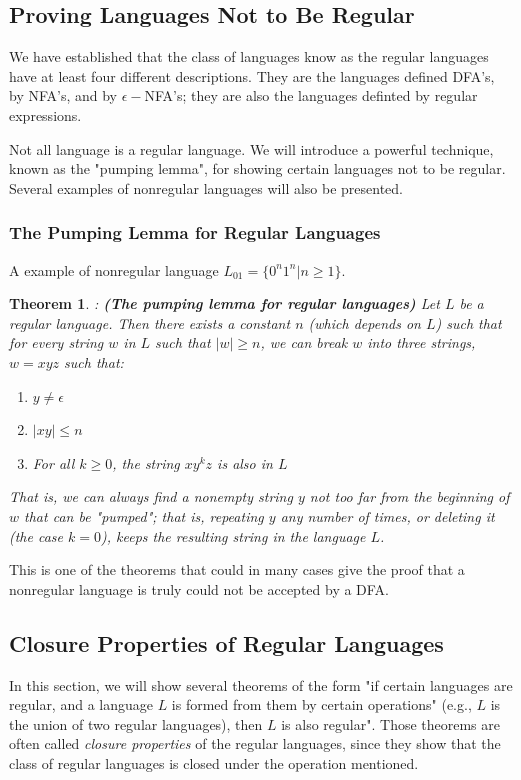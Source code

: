 \documentclass[12pt,reqno]{amsart}
\newtheorem{thm}{Theorem}[section]
\begin{document}
\subsection{Proving Languages Not to Be Regular}
We have established that the class of languages know as the regular languages have at least four different descriptions. They are the languages defined DFA's, by NFA's, and by $\epsilon-$NFA's; they are also the languages definted by regular expressions.

Not all language is a regular language. We will introduce a powerful technique, known as the "pumping lemma", for showing certain languages not to be regular. Several examples of nonregular languages will also be presented.

\subsubsection{The Pumping Lemma for Regular Languages}
A example of nonregular language $L_{01} = \{ 0^n1^n | n \geq 1\}$.
\begin{thm}: \textbf{(The pumping lemma for regular languages)} 
Let $L$ be a regular language. Then there exists a constant $n$ (which depends on $L$) such that for every string $w$ in $L$ such that $|w|\geq n$, we can break $w$ into three strings, $w=xyz$ such that:
\begin{enumerate}
	\item $y \neq \epsilon$
	\item $|xy| \leq n$
	\item For all $k \geq 0$, the string $xy^kz$ is also in $L$
\end{enumerate}
That is, we can always find a nonempty string $y$ not too far from the beginning of $w$ that can be "pumped"; that is, repeating $y$ any number of times, or deleting it (the case $k=0$), keeps the resulting string in the language $L$.
\end{thm}
This is one of the theorems that could in many cases give the proof that a nonregular language is truly could not be accepted by a DFA.


\subsection{Closure Properties of Regular Languages}
In this section, we will show several theorems of the form "if certain languages are regular, and a language $L$ is formed from them by certain operations" (e.g., $L$ is the union of two regular languages), then $L$ is also regular". Those theorems are often called \textit{closure properties} of the regular languages, since they show that the class of regular languages is closed under the operation mentioned.
\end{document}
